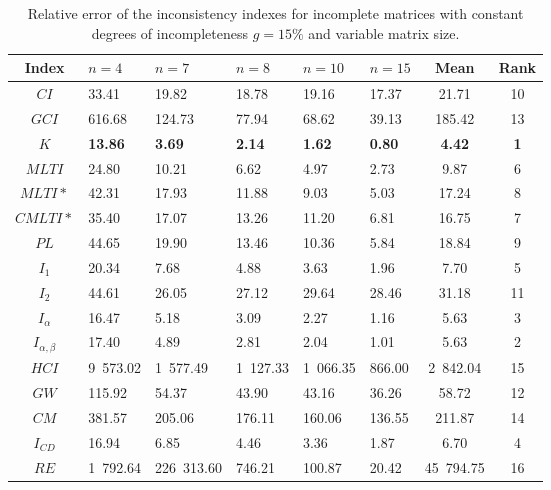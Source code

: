 \begin{table}[h]
\begin{center}
\caption{Relative error of the inconsistency indexes for incomplete matrices with constant degrees of incompleteness $g=15\%$ and variable matrix size.}
\label{tab:results1}
\begin{tabular}{|c||l|l|l|l|l||c|c|}
\hline Index & $n = 4$ & $n = 7$ & $n = 8$ & $n = 10$ & $n = 15$ & Mean & Rank \\ \hline \hline
$CI$ & 33.41 & 19.82 & 18.78 & 19.16 & 17.37 & 21.71 & 10 \\ \hline
$GCI$ & 616.68 & 124.73 & 77.94 & 68.62 & 39.13 & 185.42 & 13 \\ \hline
$K$ & \textbf{13.86} & \textbf{3.69} & \textbf{2.14} & \textbf{1.62} & \textbf{0.80} & \textbf{4.42} & \textbf{1} \\ \hline
$MLTI$ & 24.80 & 10.21 & 6.62 & 4.97 & 2.73 & 9.87 & 6 \\ \hline
$MLTI*$ & 42.31 & 17.93 & 11.88 & 9.03 & 5.03 & 17.24 & 8 \\ \hline
$CMLTI*$ & 35.40 & 17.07 & 13.26 & 11.20 & 6.81 & 16.75 & 7 \\ \hline
$PL$ & 44.65 & 19.90 & 13.46 & 10.36 & 5.84 & 18.84 & 9 \\ \hline
$I_1$ & 20.34 & 7.68 & 4.88 & 3.63 & 1.96 & 7.70 & 5 \\ \hline
$I_2$ & 44.61 & 26.05 & 27.12 & 29.64 & 28.46 & 31.18 & 11 \\ \hline
$I_{\alpha}$ & 16.47 & 5.18 & 3.09 & 2.27 & 1.16 & 5.63 & 3 \\ \hline
$I_{\alpha,\beta}$ & 17.40 & 4.89 & 2.81 & 2.04 & 1.01 & 5.63 & 2 \\ \hline
$HCI$ & 9 573.02 & 1 577.49 & 1 127.33 & 1 066.35 & 866.00 & 2 842.04 & 15 \\ \hline
$GW$ & 115.92 & 54.37 & 43.90 & 43.16 & 36.26 & 58.72 & 12 \\ \hline
$CM$ & 381.57 & 205.06 & 176.11 & 160.06 & 136.55 & 211.87 & 14 \\ \hline
$I_{CD}$ & 16.94 & 6.85 & 4.46 & 3.36 & 1.87 & 6.70 & 4 \\ \hline
$RE$ & 1 792.64 & 226 313.60 & 746.21 & 100.87 & 20.42 & 45 794.75 & 16 \\ \hline
\end{tabular}
\end{center}
\end{table}

